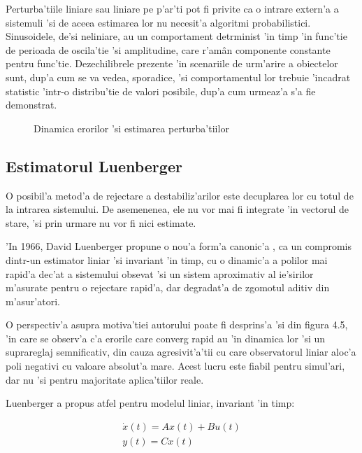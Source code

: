 \documentclass[12pt,a4paper,twoside]{report}
\begin{document}
Perturba'tiile liniare sau liniare pe p'ar'ti pot fi privite ca o intrare extern'a a sistemuli 'si de aceea estimarea lor nu necesit'a algoritmi probabilistici. Sinusoidele, de'si neliniare, au un comportament detrminist 'in timp 'in func'tie de perioada de oscila'tie 'si amplitudine, care r'am\^{a}n componente constante pentru func'tie. Dezechilibrele prezente 'in scenariile de urm'arire a obiectelor sunt, dup'a cum se va vedea, sporadice, 'si comportamentul lor trebuie 'incadrat statistic 'intr-o distribu'tie de valori posibile, dup'a cum urmeaz'a s'a fie demonstrat. 


\begin{figure}[h]
  \hspace*{-3.5cm}
  
  \caption{Dinamica erorilor 'si estimarea perturba'tiilor}
\end{figure}

\subsection{Estimatorul Luenberger}

O posibil'a metod'a de rejectare a destabiliz'arilor este decuplarea lor cu totul de la intrarea sistemului. De asemenenea, ele nu vor mai fi integrate 'in vectorul de stare, 'si prin urmare nu vor fi nici estimate. 
\vspace{5px}

'In 1966, David Luenberger propune o nou'a form'a canonic'a \cite{luen}, ca un compromis dintr-un estimator liniar 'si invariant 'in timp, cu o dinamic'a a polilor mai rapid'a dec'at a sistemului obsevat 'si un sistem aproximativ al ie'sirilor m'asurate pentru o rejectare rapid'a, dar degradat'a de zgomotul aditiv din m'asur'atori. 

\vspace{5px}

O perspectiv'a asupra motiva'tiei autorului poate fi desprins'a 'si din figura 4.5, 'in care se observ'a c'a erorile care converg rapid au 'in dinamica lor 'si un suprareglaj semnificativ, din cauza agresivit'a'tii cu care observatorul liniar aloc'a poli negativi cu valoare absolut'a mare. Acest lucru este fiabil pentru simul'ari, dar nu 'si pentru majoritate aplica'tiilor reale. 

Luenberger a propus atfel pentru modelul liniar, invariant 'in timp: 

\begin{gather}
            \dot x(t) = Ax(t) + Bu(t) \\
            y(t) = Cx(t)
\end{gather}
\end{document}
